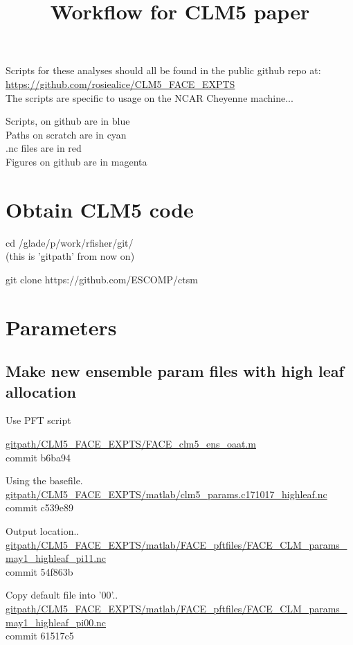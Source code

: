 \documentclass{article}
\begin{document}
\title{Workflow for CLM5 paper}
\maketitle{}

Scripts for these analyses should all be found in the public github repo at:
{\color{blue}\small{\url{https://github.com/rosiealice/CLM5_FACE_EXPTS}}}\\

The scripts are specific to usage on the NCAR Cheyenne machine...

{\color{blue} Scripts, on github are in blue}\\
{\color{cyan} Paths on scratch are in cyan}\\
{\color{red}  .nc files are in red}\\
{\color{magenta} Figures on github are in magenta}\\

\section{Obtain CLM5 code}
cd /glade/p/work/rfisher/git/\\
(this is 'gitpath' from now on)

git clone https://github.com/ESCOMP/ctsm 
\section{Parameters}


\subsection{Make new ensemble param files with high leaf allocation }

Use PFT script

{\color{blue}\small{\url{gitpath/CLM5_FACE_EXPTS/FACE_clm5_ens_oaat.m}}}\\ 
commit b6ba94

Using the basefile. \\
{\color{red}\small{\url{gitpath/CLM5_FACE_EXPTS/matlab/clm5_params.c171017_highleaf.nc}}} \\
commit c539e89


Output location..\\
{\color{red}\small{\url{gitpath/CLM5_FACE_EXPTS/matlab/FACE_pftfiles/FACE_CLM_params_may1_highleaf_pi11.nc }}} \\
commit 54f863b

Copy default file into '00'..\\
{\color{red}\small{\url{gitpath/CLM5_FACE_EXPTS/matlab/FACE_pftfiles/FACE_CLM_params_may1_highleaf_pi00.nc }}} \\
commit 61517c5 
\end{document}
